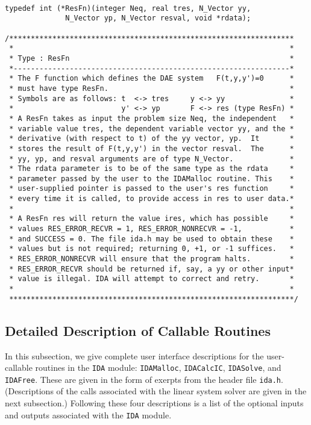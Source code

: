 \small
\begin{verbatim}

typedef int (*ResFn)(integer Neq, real tres, N_Vector yy, 
              N_Vector yp, N_Vector resval, void *rdata);
 
/******************************************************************
 *                                                                *
 * Type : ResFn                                                   *
 *----------------------------------------------------------------*        
 * The F function which defines the DAE system   F(t,y,y')=0      *
 * must have type ResFn.                                          *
 * Symbols are as follows: t  <-> tres     y <-> yy               *
 *                         y' <-> yp       F <-> res (type ResFn) *
 * A ResFn takes as input the problem size Neq, the independent   *
 * variable value tres, the dependent variable vector yy, and the *
 * derivative (with respect to t) of the yy vector, yp.  It       *
 * stores the result of F(t,y,y') in the vector resval.  The      *
 * yy, yp, and resval arguments are of type N_Vector.             *
 * The rdata parameter is to be of the same type as the rdata     *
 * parameter passed by the user to the IDAMalloc routine. This    *
 * user-supplied pointer is passed to the user's res function     *
 * every time it is called, to provide access in res to user data.*
 *                                                                *
 * A ResFn res will return the value ires, which has possible     *
 * values RES_ERROR_RECVR = 1, RES_ERROR_NONRECVR = -1,           *
 * and SUCCESS = 0. The file ida.h may be used to obtain these    *
 * values but is not required; returning 0, +1, or -1 suffices.   *
 * RES_ERROR_NONRECVR will ensure that the program halts.         *
 * RES_ERROR_RECVR should be returned if, say, a yy or other input*
 * value is illegal. IDA will attempt to correct and retry.       *
 *                                                                *
 ******************************************************************/

\end{verbatim}
\normalsize


\subsection{Detailed Description of Callable Routines}

In this subsection, we give complete user interface descriptions for
the user-callable routines in the {\tt IDA} module: {\tt IDAMalloc},
{\tt IDACalcIC}, {\tt IDASolve}, and {\tt IDAFree}.  These are given
in the form of exerpts from the header file {\tt ida.h}.  
(Descriptions of the calls associated with the linear system solver
are given in the next subsection.)  Following these four descriptions
is a list of the optional inputs and outputs associated with the 
{\tt IDA} module.

